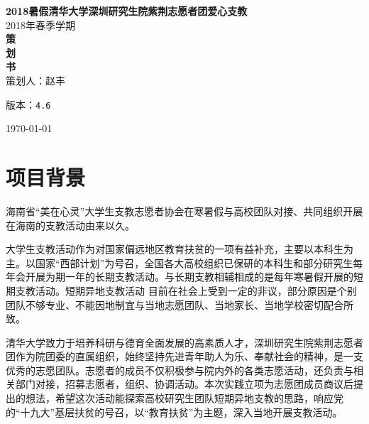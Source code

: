 \documentclass[12pt]{ctexart}
\def\version{4.6}
\newenvironment{smaller}{\zihao{5}}{\zihao{-4}}
\begin{document}
\begin{titlepage}
\begin{center}
    \vspace{-0.5in}
    \textmd{\textbf{\huge{2018暑假清华大学深圳研究生院紫荆志愿者团爱心支教}}}\\
    \normalsize\vspace{0.1in}\Large{2018年春季学期}\\
    \vspace{1in}
     \textbf{\huge{策}}\\
    \vspace{1in}
     \textbf{\huge{划}}\\
    \vspace{1in}
     \textbf{\huge{书}}\\
    \vspace{1in}
策划人：赵丰
\vspace{0.2in}
\begin{smaller}

版本：\texttt{\version}

\today
\end{smaller}
\end{center}
\end{titlepage}
\thispagestyle{empty}
\pagebreak
\pagestyle{runningpage}

\section{项目背景}
海南省“美在心灵”大学生支教志愿者协会在寒暑假与高校团队对接、共同组织开展在海南的支教活动由来以久。

大学生支教活动作为对国家偏远地区教育扶贫的一项有益补充，主要以本科生为主。以国家“西部计划”为号召，全国各大高校组织已保研的本科生和部分研究生每年会开展为期一年的长期支教活动。与长期支教相辅相成的是每年寒暑假开展的短期支教活动。短期异地支教活动
目前在社会上受到一定的非议，部分原因是个别团队不够专业、不能因地制宜与当地志愿团队、当地家长、当地学校密切配合所致。

清华大学致力于培养科研与德育全面发展的高素质人才，深圳研究生院紫荆志愿者团作为院团委的直属组织，始终坚持先进青年助人为乐、奉献社会的精神，是一支优秀的志愿团队。志愿者的成员不仅积极参与院内外的各类志愿活动，还负责与相关部门对接，招募志愿者，组织、协调活动。本次实践立项为志愿团成员商议后提出的想法，希望这次活动能探索高校研究生团队短期异地支教的思路，响应党的“十九大”基层扶贫的号召，以“教育扶贫”为主题，深入当地开展支教活动。
\end{document}
